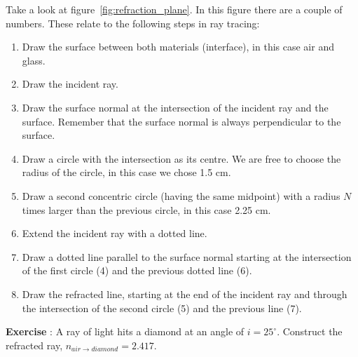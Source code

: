 Take a look at figure~\ref{fig:refraction_plane}. In this figure there are a couple of numbers. These relate to the following steps in ray tracing:
\begin{enumerate}[1.]
\item Draw the surface between both materials (interface), in this case air and glass.
\item Draw the incident ray.
\item Draw the surface normal at the intersection of the incident ray and the surface. Remember that the surface normal is always perpendicular to the surface.
\item Draw a circle with the intersection as its centre. We are free to choose the radius of the circle, in this case we chose 1.5 cm.
\item Draw a second concentric circle (having the same midpoint) with a radius $N$ times larger than the previous circle, in this case 2.25 cm.
\item Extend the incident ray with a dotted line.
\item Draw a dotted line parallel to the surface normal starting at the intersection of the first circle (4) and the previous dotted line (6).
\item Draw the refracted line, starting at the end of the incident ray and through the intersection of the second circle (5) and the previous line (7).
\end{enumerate}

\begin{shaded}
\textbf{Exercise \theExercise {}} : A ray of light hits a diamond at an angle of $i=25^{\circ}$. Construct the refracted ray, $n_{air \rightarrow diamond} = 2.417.$\end{shaded}


